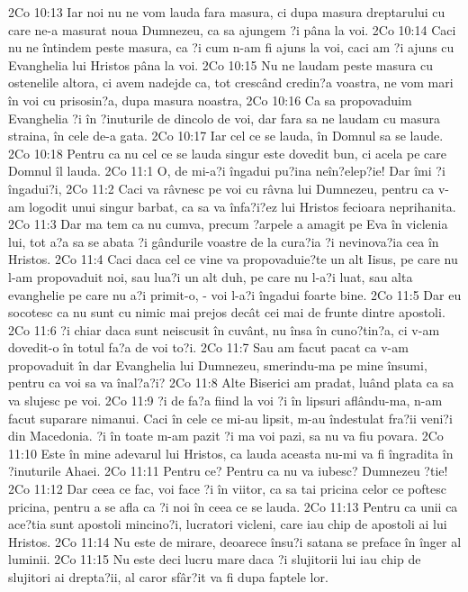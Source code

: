 2Co 10:13  Iar noi nu ne vom lauda fara masura, ci dupa masura dreptarului cu care ne-a masurat noua Dumnezeu, ca sa ajungem ?i pâna la voi.
2Co 10:14  Caci nu ne întindem peste masura, ca ?i cum n-am fi ajuns la voi, caci am ?i ajuns cu Evanghelia lui Hristos pâna la voi.
2Co 10:15  Nu ne laudam peste masura cu ostenelile altora, ci avem nadejde ca, tot crescând credin?a voastra, ne vom mari în voi cu prisosin?a, dupa masura noastra,
2Co 10:16  Ca sa propovaduim Evanghelia ?i în ?inuturile de dincolo de voi, dar fara sa ne laudam cu masura straina, în cele de-a gata.
2Co 10:17  Iar cel ce se lauda, în Domnul sa se laude.
2Co 10:18  Pentru ca nu cel ce se lauda singur este dovedit bun, ci acela pe care Domnul îl lauda.
2Co 11:1  O, de mi-a?i îngadui pu?ina neîn?elep?ie! Dar îmi ?i îngadui?i,
2Co 11:2  Caci va râvnesc pe voi cu râvna lui Dumnezeu, pentru ca v-am logodit unui singur barbat, ca sa va înfa?i?ez lui Hristos fecioara neprihanita.
2Co 11:3  Dar ma tem ca nu cumva, precum ?arpele a amagit pe Eva în viclenia lui, tot a?a sa se abata ?i gândurile voastre de la cura?ia ?i nevinova?ia cea în Hristos.
2Co 11:4  Caci daca cel ce vine va propovaduie?te un alt Iisus, pe care nu l-am propovaduit noi, sau lua?i un alt duh, pe care nu l-a?i luat, sau alta evanghelie pe care nu a?i primit-o, - voi l-a?i îngadui foarte bine.
2Co 11:5  Dar eu socotesc ca nu sunt cu nimic mai prejos decât cei mai de frunte dintre apostoli.
2Co 11:6  ?i chiar daca sunt neiscusit în cuvânt, nu însa în cuno?tin?a, ci v-am dovedit-o în totul fa?a de voi to?i.
2Co 11:7  Sau am facut pacat ca v-am propovaduit în dar Evanghelia lui Dumnezeu, smerindu-ma pe mine însumi, pentru ca voi sa va înal?a?i?
2Co 11:8  Alte Biserici am pradat, luând plata ca sa va slujesc pe voi.
2Co 11:9  ?i de fa?a fiind la voi ?i în lipsuri aflându-ma, n-am facut suparare nimanui. Caci în cele ce mi-au lipsit, m-au îndestulat fra?ii veni?i din Macedonia. ?i în toate m-am pazit ?i ma voi pazi, sa nu va fiu povara.
2Co 11:10  Este în mine adevarul lui Hristos, ca lauda aceasta nu-mi va fi îngradita în ?inuturile Ahaei.
2Co 11:11  Pentru ce? Pentru ca nu va iubesc? Dumnezeu ?tie!
2Co 11:12  Dar ceea ce fac, voi face ?i în viitor, ca sa tai pricina celor ce poftesc pricina, pentru a se afla ca ?i noi în ceea ce se lauda.
2Co 11:13  Pentru ca unii ca ace?tia sunt apostoli mincino?i, lucratori vicleni, care iau chip de apostoli ai lui Hristos.
2Co 11:14  Nu este de mirare, deoarece însu?i satana se preface în înger al luminii.
2Co 11:15  Nu este deci lucru mare daca ?i slujitorii lui iau chip de slujitori ai drepta?ii, al caror sfâr?it va fi dupa faptele lor.
